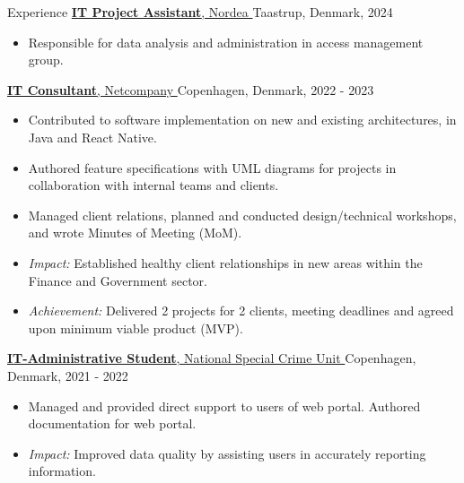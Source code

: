 \documentclass{resume}
\begin{document}
\begin{rSection}{Experience}
    \href{https://www.nordea.dk}{
        \textbf{IT Project Assistant}, Nordea
    }
    \hfill
    Taastrup, Denmark, 2024
    \begin{itemize}
        \item Responsible for data analysis and administration in access management group.
    \end{itemize}

    \href{https://netcompany.com}{
        \textbf{IT Consultant}, Netcompany
    }
    \hfill
    Copenhagen, Denmark, 2022 - 2023
    \begin{itemize}
        \item Contributed to software implementation on new and existing architectures, in Java and React Native.
        \item Authored feature specifications with UML diagrams for projects in collaboration with internal teams and clients.
        \item Managed client relations, planned and conducted design/technical workshops, and wrote Minutes of Meeting (MoM).
        \item \textit{Impact:} Established healthy client relationships in new areas within the Finance and Government sector.
        \item \textit{Achievement:} Delivered 2 projects for 2 clients, meeting deadlines and agreed upon minimum viable product (MVP).
    \end{itemize}

    \href{https://politi.dk/en/about-the-police/national-special-crime-unit}{
        \textbf{IT-Administrative Student}, National Special Crime Unit
    }
    \hfill
    Copenhagen, Denmark, 2021 - 2022
    \begin{itemize}
        \item Managed and provided direct support to users of web portal. Authored documentation for web portal.
        \item \textit{Impact:} Improved data quality by assisting users in accurately reporting information.
    \end{itemize}


\end{rSection}
\end{document}
